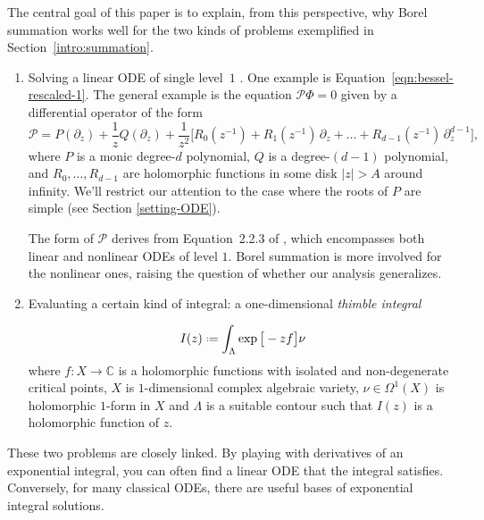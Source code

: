 \documentclass{article}
\theoremstyle{definition}
\newcommand*{\defeq}{\mathrel{\vcenter{\baselineskip0.5ex \lineskiplimit0pt
                     \hbox{\scriptsize.}\hbox{\scriptsize.}}}%
                     =}
\theoremstyle{plain}
\begin{document}
The central goal of this paper is to explain, from this perspective, why Borel summation works well for the two kinds of problems exemplified in Section~\ref{intro:summation}.
\begin{enumerate}
\item Solving a linear ODE of single level~$1$ \cite[Section 2.1]{EcalleIII}\textcolor{DarkTurquoise}{\cite[Section~5.2.2.1]{diverg-resurg-iii}}. One example is Equation~\eqref{eqn:bessel-rescaled-1}. The general example is the equation $\mathcal{P} \Phi = 0$ given by a differential operator of the form
\[ \mathcal{P} = P(\partial_z) + \frac{1}{z} Q(\partial_z) + \frac{1}{z^2}\big[ R_0(z^{-1}) + R_1(z^{-1})\,\partial_z + \ldots + R_{d-1}(z^{-1})\,\partial_z^{d-1} \big], \]
where $P$ is a monic degree-$d$ polynomial, $Q$ is a degree-$(d-1)$ polynomial, and $R_0, \ldots, R_{d-1}$ are holomorphic functions in some disk $|z|>A$ around infinity. We'll restrict our attention to the case where the roots of $P$ are simple (see Section \ref{setting-ODE}).

The form of $\mathcal{P}$ derives from Equation~2.2.3 of \cite[pag. 105]{EcalleIII}, which encompasses both linear and nonlinear ODEs of level $1$. Borel summation is more involved for the nonlinear ones, raising the question of whether our analysis generalizes.

\item Evaluating a certain kind of integral: a one-dimensional {\em thimble integral}

\begin{equation*}
I(z)\defeq\int_{\Lambda}\exp\big[-z f\big] \nu
\end{equation*}
where $f\colon X\to \mathbb{C}$ is a holomorphic functions with isolated and non-degenerate critical points, $X$ is $1$-dimensional complex algebraic variety, $\nu\in\Omega^1(X)$ is holomorphic $1$-form in $X$ and $\Lambda$ is a suitable contour such that $I(z)$ is a holomorphic function of $z$.  
\end{enumerate}

These two problems are closely linked. By playing with derivatives of an exponential integral, you can often find a linear ODE that the integral satisfies. Conversely, for many classical ODEs, there are useful bases of exponential integral solutions.

\end{document}
